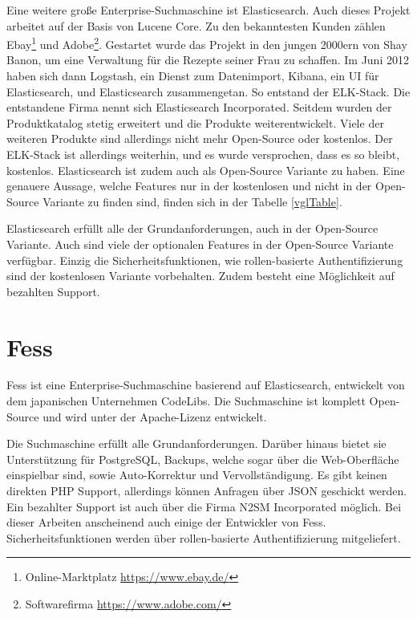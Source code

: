Eine weitere große Enterprise-Suchmaschine ist Elasticsearch. Auch dieses Projekt arbeitet auf der Basis von Lucene Core. Zu den bekanntesten Kunden zählen Ebay\footnote{Online-Marktplatz \url{https://www.ebay.de/}} und Adobe\footnote{Softwarefirma \url{https://www.adobe.com/}}. Gestartet wurde das Projekt in den jungen 2000ern von Shay Banon, um eine Verwaltung für die Rezepte seiner Frau zu schaffen. Im Juni 2012 haben sich dann Logstash, ein Dienst zum Datenimport, Kibana, ein UI für Elasticsearch, und Elasticsearch zusammengetan. So entstand der ELK-Stack. Die entstandene Firma nennt sich Elasticsearch Incorporated. Seitdem wurden der Produktkatalog stetig erweitert und die Produkte weiterentwickelt. Viele der weiteren Produkte sind allerdings nicht mehr Open-Source oder kostenlos. Der ELK-Stack ist allerdings weiterhin, und es wurde versprochen, dass es so bleibt, kostenlos. Elasticsearch ist zudem auch als Open-Source Variante zu haben. Eine genauere Aussage, welche Features nur in der kostenlosen und nicht in der Open-Source Variante zu finden sind, finden sich in der Tabelle \ref{vglTable}.

Elasticsearch erfüllt alle der Grundanforderungen, auch in der Open-Source Variante. Auch sind viele der optionalen Features in der Open-Source Variante verfügbar. Einzig die Sicherheitsfunktionen, wie rollen-basierte Authentifizierung sind der kostenlosen Variante vorbehalten. Zudem besteht eine Möglichkeit auf bezahlten Support. \cite{Elasticsearch.2019}

\section{Fess}
\label{fess}

Fess ist eine Enterprise-Suchmaschine basierend auf Elasticsearch, entwickelt von dem japanischen Unternehmen CodeLibs. Die Suchmaschine ist komplett Open-Source und wird unter der Apache-Lizenz entwickelt.

Die Suchmaschine erfüllt alle Grundanforderungen. Darüber hinaus bietet sie Unterstützung für PostgreSQL, Backups, welche sogar über die Web-Oberfläche einspielbar sind, sowie Auto-Korrektur und Vervollständigung. Es gibt keinen direkten PHP Support, allerdings können Anfragen über JSON geschickt werden. Ein bezahlter Support ist auch über die Firma N2SM Incorporated möglich. \cite{N2SM.2019} Bei dieser Arbeiten anscheinend auch einige der Entwickler von Fess. Sicherheitsfunktionen werden über rollen-basierte Authentifizierung mitgeliefert. \cite{CodeLibs.2019}

